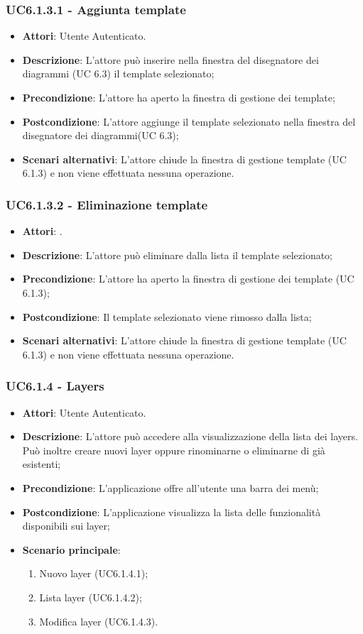 \subsubsection{UC6.1.3.1 - Aggiunta template} 
\label{sssec:UC6.1.3.1} 
\begin{itemize} 
\item \textbf{Attori}: Utente Autenticato.
\item \textbf{Descrizione}: L'attore può inserire nella finestra del disegnatore dei diagrammi (UC 6.3) il template selezionato;
\item \textbf{Precondizione}: L'attore ha aperto la finestra di gestione dei template;
\item \textbf{Postcondizione}: L'attore aggiunge il template selezionato nella finestra del disegnatore dei diagrammi(UC 6.3);
\item \textbf{Scenari alternativi}: L'attore chiude la finestra di gestione template (UC 6.1.3) e non viene effettuata nessuna operazione.
\end{itemize} 
\subsubsection{UC6.1.3.2 - Eliminazione template} 
\label{sssec:UC6.1.3.2} 
\begin{itemize} 
\item \textbf{Attori}: .
\item \textbf{Descrizione}: L'attore può eliminare dalla lista il template selezionato;
\item \textbf{Precondizione}: L'attore ha aperto la finestra di gestione dei template (UC 6.1.3);
\item \textbf{Postcondizione}: Il template selezionato viene rimosso dalla lista;
\item \textbf{Scenari alternativi}: L'attore chiude la finestra di gestione template (UC 6.1.3) e non viene effettuata nessuna operazione.
\end{itemize} 
\subsubsection{UC6.1.4 - Layers} 
\label{sssec:UC6.1.4} 
\begin{itemize} 
\item \textbf{Attori}: Utente Autenticato.
\item \textbf{Descrizione}: L’attore  può accedere alla visualizzazione della lista dei layers. Può inoltre creare nuovi layer oppure rinominarne o eliminarne di già esistenti;
\item \textbf{Precondizione}: L’applicazione offre all’utente una barra dei menù;
\item \textbf{Postcondizione}: L'applicazione visualizza la lista delle funzionalità disponibili sui layer;
\item \textbf{Scenario principale}: \begin{enumerate}\item Nuovo layer (UC6.1.4.1);\item Lista layer (UC6.1.4.2);\item Modifica layer (UC6.1.4.3). 
 \end{enumerate}
\end{itemize} 
